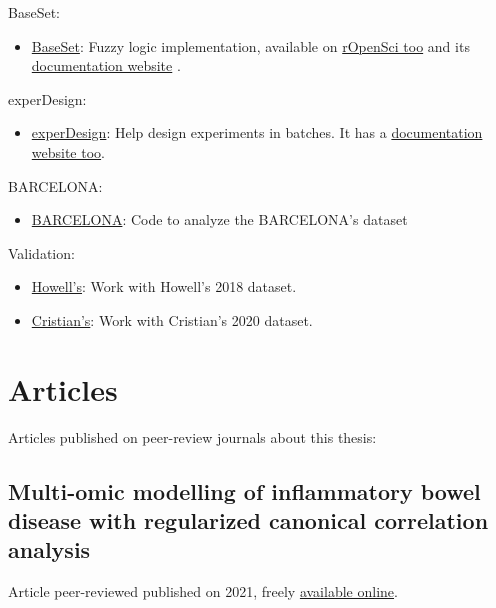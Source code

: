 \documentclass[
  12pt,
  a4paper,
  twoside,
  openright]{book}
\providecommand{\tightlist}{%
  \setlength{\itemsep}{0pt}\setlength{\parskip}{0pt}}
\begin{document}
BaseSet:

\begin{itemize}
\tightlist
\item
  \href{https://cran.r-project.org/package=BaseSet}{BaseSet}: Fuzzy logic implementation, available on \href{https://github.com/ropensci/BaseSet}{rOpenSci too} and its \href{https://docs.ropensci.org/BaseSet}{documentation website} .
\end{itemize}

experDesign:

\begin{itemize}
\tightlist
\item
  \href{https://cran.r-project.org/package=experDesign}{experDesign}: Help design experiments in batches. It has a \href{https://experDesign.llrs.dev/}{documentation website too}.
\end{itemize}

BARCELONA:

\begin{itemize}
\tightlist
\item
  \href{https://github.com/llrs/Barcelona}{BARCELONA}: Code to analyze the BARCELONA's dataset
\end{itemize}

Validation:

\begin{itemize}
\tightlist
\item
  \href{https://github.com/llrs/howell_2018}{Howell's}: Work with Howell's 2018 dataset.
\item
  \href{https://github.com/llrs/cristian_mark}{Cristian's}: Work with Cristian's 2020 dataset.
\end{itemize}

\hypertarget{articles}{%
\chapter{Articles}\label{articles}}

Articles published on peer-review journals about this thesis:

\hypertarget{app-multiomics}{%
\section{Multi-omic modelling of inflammatory bowel disease with regularized canonical correlation analysis}\label{app-multiomics}}


Article peer-reviewed published on 2021, freely \href{https://doi.org/10.1371/journal.pone.0246367}{available online}.
\end{document}
